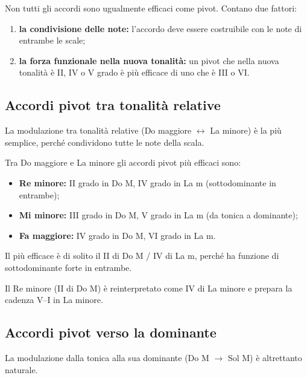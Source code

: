 Non tutti gli accordi sono ugualmente efficaci come pivot. Contano due fattori:

\begin{enumerate}
	\item \textbf{la condivisione delle note:} l'accordo deve essere costruibile con le note di entrambe le scale;
	\item \textbf{la forza funzionale nella nuova tonalità:} un pivot che nella nuova tonalità è II, IV o V grado è più efficace di uno che è III o VI.
\end{enumerate}

\subsection{Accordi pivot tra tonalità relative}
\label{subsec:pivot_relative}

La modulazione tra tonalità relative (Do maggiore $\leftrightarrow$ La minore) è la più semplice, perché condividono tutte le note della scala.

\begin{regola}
	\label{reg:pivot_relative}
	Tra Do maggiore e La minore gli accordi pivot più efficaci sono:
	\begin{itemize}
		\item \textbf{Re minore:} II grado in Do M, IV grado in La m (sottodominante in entrambe);
		\item \textbf{Mi minore:} III grado in Do M, V grado in La m (da tonica a dominante);
		\item \textbf{Fa maggiore:} IV grado in Do M, VI grado in La m.
	\end{itemize}
	Il più efficace è di solito il II di Do M / IV di La m, perché ha funzione di sottodominante forte in entrambe.
\end{regola}

\begin{esempio}
	\label{ex:mod_do_lam}
	Il Re minore (II di Do M) è reinterpretato come IV di La minore e prepara la cadenza V--I in La minore.
\end{esempio}

\subsection{Accordi pivot verso la dominante}
\label{subsec:pivot_dominante}

La modulazione dalla tonica alla sua dominante (Do M $\rightarrow$ Sol M) è altrettanto naturale.

